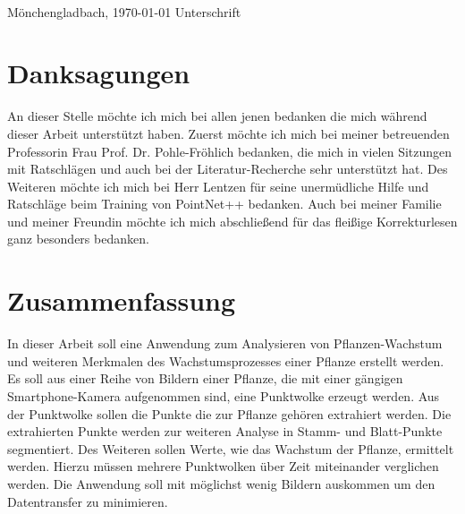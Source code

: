 \documentclass[12pt,titlepage, twoside]{article}
\begin{document}
\vspace{8ex}
\begin{tabbing}
\underline{\hspace{16em}} \hspace{3em}\= \underline{\hspace{14em}} \\
Mönchengladbach, \today \> Unterschrift
\end{tabbing}

\newpage


\section*{Danksagungen}

An dieser Stelle möchte ich mich bei allen jenen bedanken die mich während dieser Arbeit unterstützt haben.
Zuerst möchte ich mich bei meiner betreuenden Professorin Frau Prof. Dr. Pohle-Fröhlich bedanken, die mich in vielen Sitzungen mit Ratschlägen und auch bei der Literatur-Recherche sehr unterstützt hat.
Des Weiteren möchte ich mich bei Herr Lentzen für seine unermüdliche Hilfe und Ratschläge beim Training von PointNet++ bedanken.
Auch bei meiner Familie und meiner Freundin möchte ich mich abschließend für das fleißige Korrekturlesen ganz besonders bedanken.

\newpage
\section*{Zusammenfassung}
In dieser Arbeit soll eine Anwendung zum Analysieren von Pflanzen-Wachstum und weiteren Merkmalen des Wachstumsprozesses einer Pflanze erstellt werden. 
Es soll aus einer Reihe von Bildern einer Pflanze, die mit einer gängigen Smartphone-Kamera aufgenommen sind, eine Punktwolke erzeugt werden. 
Aus der Punktwolke sollen die Punkte die zur Pflanze gehören extrahiert werden. 
Die extrahierten Punkte werden zur weiteren Analyse in Stamm- und Blatt-Punkte segmentiert.
Des Weiteren sollen Werte, wie das Wachstum der Pflanze, ermittelt werden. Hierzu müssen mehrere Punktwolken über Zeit miteinander verglichen werden.
Die Anwendung soll mit möglichst wenig Bildern auskommen um den Datentransfer zu minimieren.

\setcounter{page}{1}
\end{document}
